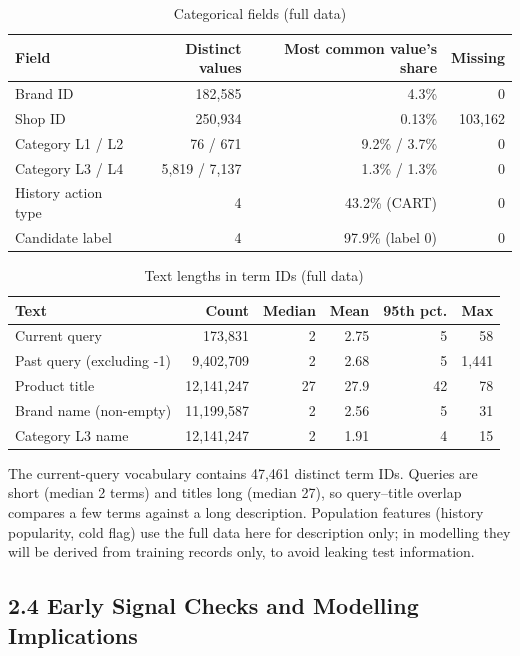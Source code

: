 \documentclass[11pt,a4paper]{article}
\newcommand{\hd}[1]{\textbf{#1}}
\newcommand{\tablestyle}{\small}
\newcommand{\headrow}{}
\begin{document}
\begin{table}[H]
\caption{Categorical fields (full data)}
\tablestyle
\centering
\begin{tabularx}{0.9\textwidth}{L R R R}
\toprule
\headrow \hd{Field} & \hd{Distinct values} & \hd{Most common value's share} & \hd{Missing} \\
\midrule
Brand ID & 182,585 & 4.3\% & 0 \\
Shop ID & 250,934 & 0.13\% & 103,162 \\
Category L1 / L2 & 76 / 671 & 9.2\% / 3.7\% & 0 \\
Category L3 / L4 & 5,819 / 7,137 & 1.3\% / 1.3\% & 0 \\
History action type & 4 & 43.2\% (CART) & 0 \\
Candidate label & 4 & 97.9\% (label 0) & 0 \\
\bottomrule
\end{tabularx}
\end{table}

\begin{table}[H]
\caption{Text lengths in term IDs (full data)}
\tablestyle
\centering
\begin{tabularx}{0.9\textwidth}{L R R R R R}
\toprule
\headrow \hd{Text} & \hd{Count} & \hd{Median} & \hd{Mean} & \hd{95th pct.} & \hd{Max} \\
\midrule
Current query & 173,831 & 2 & 2.75 & 5 & 58 \\
Past query (excluding -1) & 9,402,709 & 2 & 2.68 & 5 & 1,441 \\
Product title & 12,141,247 & 27 & 27.9 & 42 & 78 \\
Brand name (non-empty) & 11,199,587 & 2 & 2.56 & 5 & 31 \\
Category L3 name & 12,141,247 & 2 & 1.91 & 4 & 15 \\
\bottomrule
\end{tabularx}
\end{table}

The current-query vocabulary contains 47,461 distinct term IDs. Queries are short (median 2 terms) and titles long (median 27), so query--title overlap compares a few terms against a long description. Population features (history popularity, cold flag) use the full data here for description only; in modelling they will be derived from training records only, to avoid leaking test information.

\subsection{2.4 Early Signal Checks and Modelling Implications}
\end{document}
